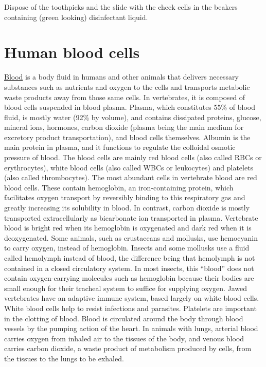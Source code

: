 Dispose of the toothpicks and the slide with the cheek cells in the
beakers containing (green looking) disinfectant liquid.

\section{Human blood cells}\label{human-blood-cells}

\href{https://en.wikipedia.org/wiki/Blood}{Blood} is a body fluid in
humans and other animals that delivers necessary substances such as
nutrients and oxygen to the cells and transports metabolic waste
products away from those same cells. In vertebrates, it is composed of
blood cells suspended in blood plasma. Plasma, which constitutes 55\% of
blood fluid, is mostly water (92\% by volume), and contains dissipated
proteins, glucose, mineral ions, hormones, carbon dioxide (plasma being
the main medium for excretory product transportation), and blood cells
themselves. Albumin is the main protein in plasma, and it functions to
regulate the colloidal osmotic pressure of blood. The blood cells are
mainly red blood cells (also called RBCs or erythrocytes), white blood
cells (also called WBCs or leukocytes) and platelets (also called
thrombocytes). The most abundant cells in vertebrate blood are red blood
cells. These contain hemoglobin, an iron-containing protein, which
facilitates oxygen transport by reversibly binding to this respiratory
gas and greatly increasing its solubility in blood. In contrast, carbon
dioxide is mostly transported extracellularly as bicarbonate ion
transported in plasma. Vertebrate blood is bright red when its
hemoglobin is oxygenated and dark red when it is deoxygenated. Some
animals, such as crustaceans and mollusks, use hemocyanin to carry
oxygen, instead of hemoglobin. Insects and some mollusks use a fluid
called hemolymph instead of blood, the difference being that hemolymph
is not contained in a closed circulatory system. In most insects, this
``blood'' does not contain oxygen-carrying molecules such as hemoglobin
because their bodies are small enough for their tracheal system to
suffice for supplying oxygen. Jawed vertebrates have an adaptive immune
system, based largely on white blood cells. White blood cells help to
resist infections and parasites. Platelets are important in the clotting
of blood. Blood is circulated around the body through blood vessels by
the pumping action of the heart. In animals with lungs, arterial blood
carries oxygen from inhaled air to the tissues of the body, and venous
blood carries carbon dioxide, a waste product of metabolism produced by
cells, from the tissues to the lungs to be exhaled.


